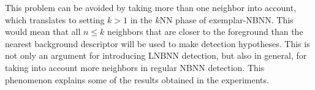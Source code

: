 
This problem can be avoided by taking more than one neighbor into account, which translates to setting $k>1$ in the $k$NN phase of exemplar-NBNN. This would mean that all $n\leq k$ neighbors that are closer to the foreground than the nearest background descriptor will be used to make detection hypotheses. This is not only an argument for introducing LNBNN detection, but also in general, for taking into account more neighbors in regular NBNN detection. This phenomenon explains some of the results obtained in the experiments.


